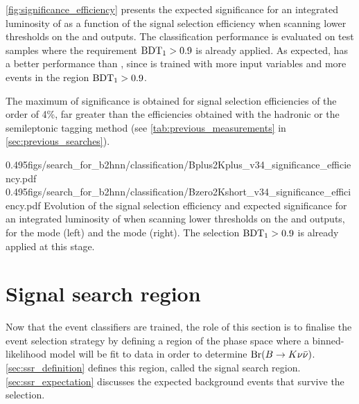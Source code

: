 \cref{fig:significance_efficiency} presents the expected significance for an integrated luminosity of \lumion as a function of the signal selection efficiency when scanning lower thresholds on the \bdto and \bdtt outputs.
The classification performance is evaluated on test samples where the requirement $\mathrm{BDT_1}>0.9$ is already applied.
As expected, \bdtt has a better performance than \bdto, since \bdtt is trained with more input variables and more events in the region $\mathrm{BDT_1}>0.9$.

The maximum of significance is obtained for signal selection efficiencies of the order of 4\%, far greater than the efficiencies obtained with the hadronic or the semileptonic tagging method (see \cref{tab:previous_measurements} in \cref{sec:previous_searches}).

{0.495}{figs/search_for_b2hnn/classification/Bplus2Kplus_v34_significance_efficiency.pdf}
{0.495}{figs/search_for_b2hnn/classification/Bzero2Kshort_v34_significance_efficiency.pdf}
{
Evolution of the signal selection efficiency and expected significance for an integrated luminosity of \lumion when scanning lower thresholds on the \bdto and \bdtt outputs, for the \BKpnn mode (left) and the \BKznn mode (right).
The selection $\mathrm{\mathrm{BDT_1}>0.9}$ is already applied at this stage.
}
\clearpage
\section{Signal search region} \label{sec:signal_search_region}
Now that the event classifiers are trained, the role of this section is to finalise the event selection strategy by defining a region of the phase space where a binned-likelihood model will be fit to data in order to determine $\mathrm{\mathrm{Br}}(B\rightarrow K\nu\bar{\nu})$.
\cref{sec:ssr_definition} defines this region, called the signal search region.
\cref{sec:ssr_expectation} discusses the expected background events that survive the selection.
